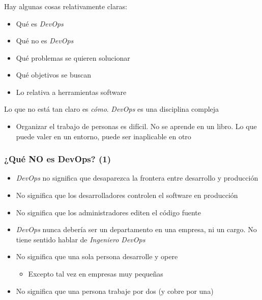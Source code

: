 \documentclass[ucs]{beamer}
\begin{document}
\begin{frame}[fragile]
\frametitle{}


Hay algunas cosas relativamente claras:
\begin{itemize}
\item
Qué es 
\emph{DevOps} 

\item
Qué no es 
\emph{DevOps} 

\item
Qué problemas se quieren solucionar

\item
Qué objetivos se buscan

\item
Lo relativa a herramientas 
software

\end{itemize}


Lo que no está tan claro es \emph{cómo}.
\emph{DevOps} es una disciplina compleja
\begin{itemize}
\item
Organizar el trabajo de personas es difícil. No se aprende en un libro. Lo que
puede valer en un entorno, puede ser inaplicable en otro
\end{itemize}

\end{frame}



\begin{frame}[fragile]
\frametitle{¿Qué NO es DevOps? (1)}

\begin{itemize}
\item
\emph{DevOps}
no significa que desaparezca la frontera
entre desarrollo y producción

\item
No significa que los desarrolladores controlen el software en producción

\item
No significa que los administradores editen el código fuente

\item
\emph{DevOps}
nunca debería ser un departamento en una empresa, ni un cargo.
No tiene sentido hablar de \emph{Ingeniero DevOps}

\item
No significa que una sola persona desarrolle y opere

\begin{itemize}
\item
Excepto tal vez en empresas muy pequeñas
\end{itemize}

\item
No significa que una persona trabaje por dos (y cobre por una)
\end{itemize}
\end{frame}
\end{document}
